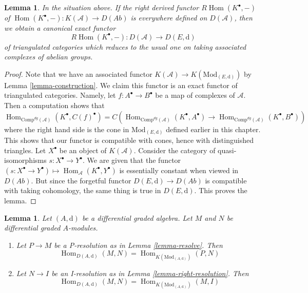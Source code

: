 \documentclass{stacks-project}
\theoremstyle{plain}
\newtheorem{lemma}[subsection]{Lemma}
\theoremstyle{definition}
\theoremstyle{remark}
\numberwithin{equation}{subsection}
\def\Hom{\mathop{\mathrm{Hom}}\nolimits}
\begin{document}
\begin{lemma}
\label{lemma-existence-of-derived}
In the situation above. If the right derived functor $R\Hom(K^\bullet, -)$
of $\Hom(K^\bullet, -) : K(\mathcal{A}) \to D(\textit{Ab})$
is everywhere defined on $D(\mathcal{A})$, then we obtain a canonical exact
functor
$$
R\Hom(K^\bullet, -) : D(\mathcal{A}) \longrightarrow D(E, \text{d})
$$
of triangulated categories which reduces to the usual one  on taking
associated complexes of abelian groups.
\end{lemma}

\begin{proof}
Note that we have an associated functor
$K(\mathcal{A}) \to K(\text{Mod}_{(E, \text{d})})$ by
Lemma \ref{lemma-construction}.
We claim this functor is an exact functor of triangulated categories.
Namely, let $f : A^\bullet \to B^\bullet$ be a map of complexes
of $\mathcal{A}$. Then a computation shows that
$$
\Hom_{\text{Comp}^{dg}(\mathcal{A})}(K^\bullet, C(f)^\bullet)
=
C\left(
\Hom_{\text{Comp}^{dg}(\mathcal{A})}(K^\bullet, A^\bullet) \to
\Hom_{\text{Comp}^{dg}(\mathcal{A})}(K^\bullet, B^\bullet)
\right)
$$
where the right hand side is the cone in $\text{Mod}_{(E, \text{d})}$
defined earlier in this chapter.
This shows that our functor is compatible with cones, hence with
distinguished triangles. Let $X^\bullet$ be an object of $K(\mathcal{A})$.
Consider the category of quasi-isomorphisms $s : X^\bullet \to Y^\bullet$.
We are given that the functor
$(s : X^\bullet \to Y^\bullet) \mapsto \Hom_\mathcal{A}(K^\bullet, Y^\bullet)$
is essentially constant when viewed in $D(\textit{Ab})$.
But since the forgetful functor $D(E, \text{d}) \to D(\textit{Ab})$
is compatible with taking cohomology, the same thing is true in
$D(E, \text{d})$. This proves the lemma.
\end{proof}

\begin{lemma}
\label{lemma-hom-derived}
Let $(A, \text{d})$ be a differential graded algebra.
Let $M$ and $N$ be differential graded $A$-modules.
\begin{enumerate}
\item Let $P \to M$ be a P-resolution as in
Lemma \ref{lemma-resolve}. Then
$$
\Hom_{D(A, \text{d})}(M, N) =
\Hom_{K(\text{Mod}_{(A, \text{d})})}(P, N)
$$
\item Let $N \to I$ be an I-resolution as in
Lemma \ref{lemma-right-resolution}. Then
$$
\Hom_{D(A, \text{d})}(M, N) =
\Hom_{K(\text{Mod}_{(A, \text{d})})}(M, I)
$$
\end{enumerate}
\end{lemma}
\end{document}

